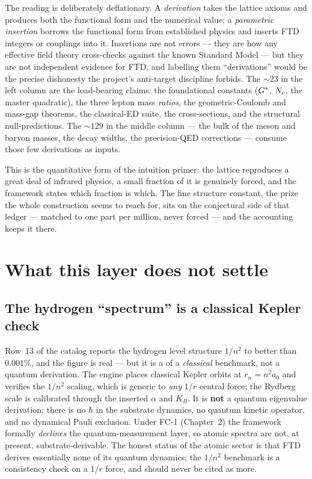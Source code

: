 The reading is deliberately deflationary. A \emph{derivation} takes the lattice
axioms and produces both the functional form and the numerical value; a
\emph{parametric insertion} borrows the functional form from established physics
and inserts FTD integers or couplings into it. Insertions are not errors --- they
are how any effective field theory cross-checks against the known Standard Model
--- but they are not independent evidence for FTD, and labelling them
``derivations'' would be the precise dishonesty the project's anti-target
discipline forbids. The ${\sim}23$ in the left column are the load-bearing claims:
the foundational constants ($G^{*}$, $N_c$, the master quadratic), the three lepton
mass \emph{ratios}, the geometric-Coulomb and mass-gap theorems, the classical-ED
suite, the cross-sections, and the structural null-predictions. The ${\sim}129$ in
the middle column --- the bulk of the meson and baryon masses, the decay widths,
the precision-QED corrections --- consume those few derivations as inputs.

This is the quantitative form of the intuition primer: the lattice reproduces a
great deal of infrared physics, a small fraction of it is genuinely forced, and
the framework states which fraction is which. The fine structure constant, the
prize the whole construction seems to reach for, sits on the conjectural side of
that ledger --- matched to one part per million, never forced --- and the
accounting keeps it there.

\section{What this layer does not settle}
\label{sec:physics-boundary}

\subsection{The hydrogen ``spectrum'' is a classical Kepler check}
\label{sec:hydrogen-caveat}

Row~13 of the catalog reports the hydrogen level structure $1/n^2$ to better than
$0.001\%$, and the figure is real --- but it is a  of a
\emph{classical} benchmark, not a quantum derivation. The engine places classical
Kepler orbits at $r_n = n^2 a_0$ and verifies the $1/n^2$ scaling, which is
generic to \emph{any} $1/r$ central force; the Rydberg scale is calibrated through
the inserted $\alpha$ and $K_B$. It is \textbf{not} a quantum eigenvalue
derivation: there is no $\hbar$ in the substrate dynamics, no quantum kinetic
operator, and no dynamical Pauli exclusion. Under FC-1 (Chapter~2) the framework
formally \emph{declines} the quantum-measurement layer, so atomic spectra are
not, at present, substrate-derivable. The honest status of the atomic sector is
that FTD derives essentially none of its quantum dynamics; the $1/n^2$ benchmark
is a consistency check on a $1/r$ force, and should never be cited as more.


